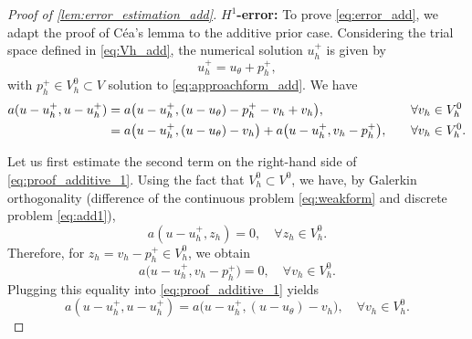 \begin{proof}[Proof of \cref{lem:error_estimation_add}]
    \textbf{$H^1$-error:}   To prove \eqref{eq:error_add}, we adapt the proof of Céa's lemma to the additive prior case.
    Considering the trial space defined in \eqref{eq:Vh_add}, the numerical solution $u_h^+$ is given by
    \[
        u_h^+=u_{\theta}+p_h^+,
    \]
    with $p_h^+ \in V_h^0 \subset V$ solution to \eqref{eq:approachform_add}.
    We have
    \begin{alignat}{3}
        \notag
        a(u-u_h^+, u-u_h^+)
         & =
        a\big(u-u_h^+,(u-u_{\theta})-p_h^+ - v_h+ v_h\big),
         &   & \quad \forall v_h \in V_h^0  \\
        \label{eq:proof_additive_1}
         & =
        a\big(u-u_h^+,(u-u_{\theta})-v_h\big)  +
        a\big(u-u_h^+, v_h-p_h^+\big),
         &   & \quad \forall v_h \in V_h^0.
    \end{alignat}

    Let us first estimate the second term on the right-hand side of \eqref{eq:proof_additive_1}.
    Using the fact that $V_h^0\subset V^0$, we have, by Galerkin orthogonality (difference of the continuous problem \eqref{eq:weakform} and discrete problem \eqref{eq:add1}),
    \begin{equation}\label{eq:orth-gal+}
        a(u-u_h^+, z_h)=0, \quad \forall z_h \in V_h^0.
    \end{equation}
    Therefore, for  $z_h=v_h-p_h^+\in V_h^0$, we obtain
    \[
        a\big(u-u_h^+, v_h-p_h^+\big)=0, \quad \forall v_h \in V_h^0.
    \]
    Plugging this equality into \eqref{eq:proof_additive_1} yields
    \[
        a(u-u_h^+, u-u_h^+)=a\big(u-u_h^+,(u-u_{\theta})-v_h\big), \quad \forall v_h \in V_h^0.
    \]


\end{proof}
